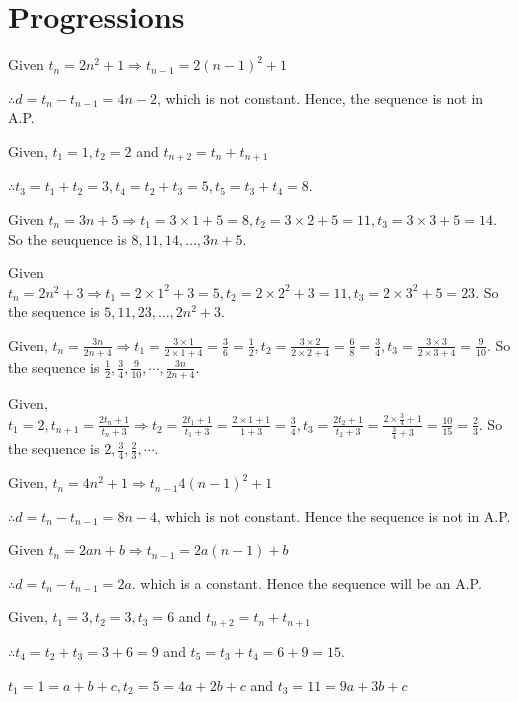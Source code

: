 \chapter{Progressions}
\startitemize[n, 1*broad]
\item Given $t_n = 2n^2 + 1 \Rightarrow t_{n - 1} = 2(n - 1)^2 + 1$

  $\therefore d = t_n - t_{n - 1} = 4n - 2$, which is not constant. Hence, the sequence is not in A.P.
\item Given, $t_1 = 1, t_2 = 2$ and $t_{n+2} = t_n + t_{n + 1}$

  $\therefore t_3 = t_1 + t_2 = 3, t_4 = t_2 + t_3 = 5, t_5 = t_3 + t_4 = 8$.
\item Given $t_n = 3n + 5 \Rightarrow t_1 = 3\times1 + 5 = 8, t_2 = 3\times2 + 5 = 11, t_3 = 3\times3 + 5 = 14$. So the seuquence
  is $8, 11, 14, \ldots, 3n + 5$.
\item Given $t_n = 2n^2 + 3 \Rightarrow t_1 = 2\times1^2 + 3 = 5, t_2 = 2\times2^2 + 3 = 11, t_3 = 2\times3^2 + 5 = 23$. So the
  sequence is $5, 11, 23, \ldots, 2n^2 + 3$.
\item Given, $t_n = \frac{3n}{2n + 4}\Rightarrow t_1 = \frac{3\times1}{2\times1 + 4} = \frac{3}{6} = \frac{1}{2}, t_2 =
  \frac{3\times2}{2\times2 + 4} = \frac{6}{8} = \frac{3}{4}, t_3 = \frac{3\times3}{2\times3 + 4} = \frac{9}{10}$. So the
  sequence is $\frac{1}{2}, \frac{3}{4}, \frac{9}{10}, \cdots, \frac{3n}{2n + 4}$.
\item Given, $t_1 = 2, t_{n + 1} = \frac{2t_n + 1}{t_n + 3} \Rightarrow t_2 = \frac{2t_1 + 1}{t_1 + 3} = \frac{2\times1 + 1}{1 + 3}
  = \frac{3}{4}, t_3 = \frac{2t_2 + 1}{t_2 + 3} = \frac{2\times\tfrac{3}{4} + 1}{\tfrac{3}{4} + 3} = \frac{10}{15} = \frac{2}{3}$.
  So the sequence is $2, \frac{3}{4}, \frac{2}{3}, \cdots$.
\item Given, $t_n = 4n^2 + 1 \Rightarrow t_{n - 1} 4(n - 1)^2 + 1$

  $\therefore d = t_n - t_{n - 1} = 8n - 4$, which is not constant. Hence the sequence is not in A.P.
\item Given $t_n = 2an + b \Rightarrow t_{n - 1} = 2a(n - 1) + b$

  $\therefore d = t_n - t_{n - 1} = 2a$. which is a constant. Hence the sequence will be an A.P.
\item Given, $t_1 = 3, t_2 = 3, t_3 = 6$ and $t_{n + 2} = t_n + t_{n + 1}$

  $\therefore t_4 = t_2 + t_3 = 3 + 6 = 9$ and $t_5 = t_3 + t_4 = 6 + 9 = 15$.
\item $t_1 = 1 = a + b + c, t_2 = 5 = 4a + 2b + c$ and $t_3 = 11 = 9a + 3b + c$

